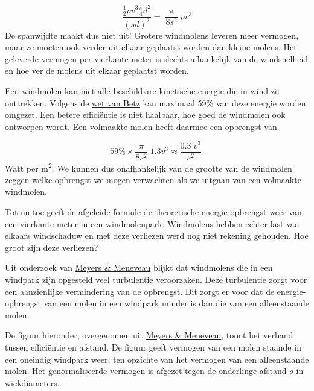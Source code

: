 \documentclass[
  11pt,
  a4paper,
]{book}
\begin{document}
\[ \frac{\frac{1}{2} \rho v^3 \frac{\pi}{4} d^2}{(sd)^2} = \; \frac{\pi}{8s^2} \; \rho v^3 \]
\noindent
De spanwijdte maakt dus niet uit! Grotere windmolens leveren meer vermogen, maar ze moeten ook verder uit elkaar geplaatst worden dan kleine molens. Het geleverde vermogen per vierkante meter is slechts afhankelijk van de windsnelheid en hoe ver de molens uit elkaar geplaatst worden.

\medskip

Een windmolen kan niet alle beschikbare kinetische energie die in wind zit onttrekken. Volgens de \href{https://nl.wikipedia.org/wiki/Wet_van_Betz}{wet van Betz} kan maximaal 59\% van deze energie worden omgezet. Een betere efficiëntie is niet haalbaar, hoe goed de windmolen ook ontworpen wordt. Een volmaakte molen heeft daarmee een opbrengst van

\[  59\% \times \frac{\pi}{8s^2} \; 1.3 v^3\approx \frac{0.3\;v^3}{s^2} \;  \]
Watt per m\textsuperscript{2}. We kunnen dus onafhankelijk van de grootte van de windmolen zeggen welke opbrengst we mogen verwachten als we uitgaan van een volmaakte windmolen.

\bigskip

Tot nu toe geeft de afgeleide formule de theoretische energie-opbrengst weer van een vierkante meter in een windmolenpark. Windmolens hebben echter last van elkaars windschaduw en met deze verliezen werd nog niet rekening gehouden. Hoe groot zijn deze verliezen?

\medskip

Uit onderzoek van \href{https://www.researchgate.net/publication/230284417_Optimal_turbine_spacing_in_fully_developed_wind_farm_boundary_layers}{Meyers \& Meneveau} blijkt dat windmolens die in een windpark zijn opgesteld veel turbulentie veroorzaken. Deze turbulentie zorgt voor een aanzienlijke vermindering van de opbrengst. Dit zorgt er voor dat de energie-opbrengst van een molen in een windpark minder is dan die van een alleenstaande molen.

\medskip

De figuur hieronder, overgenomen uit \href{https://www.researchgate.net/publication/230284417_Optimal_turbine_spacing_in_fully_developed_wind_farm_boundary_layers}{Meyers \& Meneveau}, toont het verband tussen efficiëntie en afstand. De figuur geeft vermogen van een molen staande in een oneindig windpark weer, ten opzichte van het vermogen van een alleenstaande molen. Het genormaliseerde vermogen is afgezet tegen de onderlinge afstand \(s\) in wiekdiameters.
\end{document}
